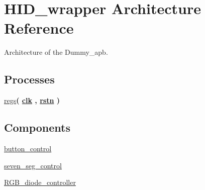 \hypertarget{classbutton__and__hex__wrapper_1_1HID__wrapper}{\section{H\-I\-D\-\_\-wrapper Architecture Reference}
\label{classbutton__and__hex__wrapper_1_1HID__wrapper}
}


Architecture of the Dummy\-\_\-apb.  


\subsection*{Processes}
 \begin{DoxyCompactItemize}
\item 
\hypertarget{classbutton__and__hex__wrapper_1_1HID__wrapper_a7b544993da64c8f112760250ae38b7cd}{\hyperlink{classbutton__and__hex__wrapper_1_1HID__wrapper_a7b544993da64c8f112760250ae38b7cd}{regs}{\bfseries  ( {\bfseries {\bfseries \hyperlink{classbutton__and__hex__wrapper_af1c59ef8e5ba3edeeb313b4be18d7d8a}{clk}} \textcolor{vhdlchar}{ }\textcolor{vhdlchar}{ }\textcolor{vhdlchar}{ }} , {\bfseries {\bfseries \hyperlink{classbutton__and__hex__wrapper_a8fb8388e1e2f3ac69332573f5909b4e8}{rstn}} \textcolor{vhdlchar}{ }} )}}\label{classbutton__and__hex__wrapper_1_1HID__wrapper_a7b544993da64c8f112760250ae38b7cd}

\end{DoxyCompactItemize}
\subsection*{Components}
 \begin{DoxyCompactItemize}
\item 
\hypertarget{classbutton__and__hex__wrapper_1_1HID__wrapper_a2f192fc88cf30c3a81528c3bec449d7c}{\hyperlink{classbutton__and__hex__wrapper_1_1HID__wrapper_a2f192fc88cf30c3a81528c3bec449d7c}{button\-\_\-control}  {\bfseries }  }\label{classbutton__and__hex__wrapper_1_1HID__wrapper_a2f192fc88cf30c3a81528c3bec449d7c}

\item 
\hypertarget{classbutton__and__hex__wrapper_1_1HID__wrapper_ab9483222d3cb1f8d2e2d5b9f7b050991}{\hyperlink{classbutton__and__hex__wrapper_1_1HID__wrapper_ab9483222d3cb1f8d2e2d5b9f7b050991}{seven\-\_\-seg\-\_\-control}  {\bfseries }  }\label{classbutton__and__hex__wrapper_1_1HID__wrapper_ab9483222d3cb1f8d2e2d5b9f7b050991}

\item 
\hypertarget{classbutton__and__hex__wrapper_1_1HID__wrapper_a4bd7f19e51dcb73ce4329b7ea3129132}{\hyperlink{classbutton__and__hex__wrapper_1_1HID__wrapper_a4bd7f19e51dcb73ce4329b7ea3129132}{R\-G\-B\-\_\-diode\-\_\-controller}  {\bfseries }  }\label{classbutton__and__hex__wrapper_1_1HID__wrapper_a4bd7f19e51dcb73ce4329b7ea3129132}

\end{DoxyCompactItemize}
